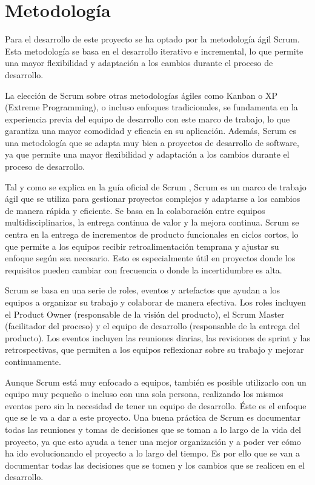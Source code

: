 \section{Metodología}
\label{sec:metodologia}

Para el desarrollo de este proyecto se ha optado por la metodología ágil Scrum. Esta metodología se basa en el desarrollo iterativo e incremental, lo que permite una mayor flexibilidad y adaptación a los cambios durante el proceso de desarrollo.

La elección de Scrum sobre otras metodologías ágiles como Kanban o XP (Extreme Programming), o incluso enfoques tradicionales, se fundamenta en la experiencia previa del equipo de desarrollo con este marco de trabajo, lo que garantiza una mayor comodidad y eficacia en su aplicación.
Además, Scrum es una metodología que se adapta muy bien a proyectos de desarrollo de software, ya que permite una mayor flexibilidad y adaptación a los cambios durante el proceso de desarrollo.

Tal y como se explica en la guía oficial de Scrum \parencite{scrum-guide}, Scrum es un marco de trabajo ágil que se utiliza para gestionar proyectos complejos y adaptarse a los cambios de manera rápida y eficiente. Se basa en la colaboración entre equipos multidisciplinarios, la entrega continua de valor y la mejora continua.
Scrum se centra en la entrega de incrementos de producto funcionales en ciclos cortos, lo que permite a los equipos recibir retroalimentación temprana y ajustar su enfoque según sea necesario. Esto es especialmente útil en proyectos donde los requisitos pueden cambiar con frecuencia o donde la incertidumbre es alta.

Scrum se basa en una serie de roles, eventos y artefactos que ayudan a los equipos a organizar su trabajo y colaborar de manera efectiva. Los roles incluyen el Product Owner (responsable de la visión del producto), el Scrum Master (facilitador del proceso) y el equipo de desarrollo (responsable de la entrega del producto). Los eventos incluyen las reuniones diarias, las revisiones de sprint y las retrospectivas, que permiten a los equipos reflexionar sobre su trabajo y mejorar continuamente.

Aunque Scrum está muy enfocado a equipos, también es posible utilizarlo con un equipo muy pequeño o incluso con una sola persona, realizando los mismos eventos pero sin la necesidad de tener un equipo de desarrollo.
Éste es el enfoque que se le va a dar a este proyecto. Una buena práctica de Scrum es documentar todas las reuniones y tomas de decisiones que se toman a lo largo de la vida del proyecto, ya que esto ayuda a tener una mejor organización y a poder ver cómo ha ido evolucionando el proyecto a lo largo del tiempo.
Es por ello que se van a documentar todas las decisiones que se tomen y los cambios que se realicen en el desarrollo.


